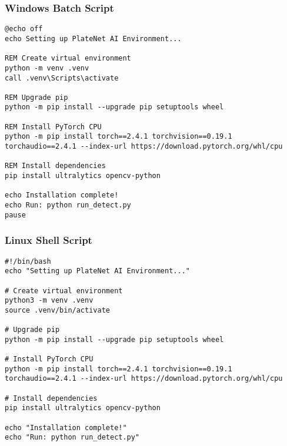 \documentclass[12pt,a4paper]{article}
\begin{document}
\subsubsection{Windows Batch Script}
\begin{lstlisting}[caption=Windows Installation Script]
@echo off
echo Setting up PlateNet AI Environment...

REM Create virtual environment
python -m venv .venv
call .venv\Scripts\activate

REM Upgrade pip
python -m pip install --upgrade pip setuptools wheel

REM Install PyTorch CPU
python -m pip install torch==2.4.1 torchvision==0.19.1 torchaudio==2.4.1 --index-url https://download.pytorch.org/whl/cpu

REM Install dependencies
pip install ultralytics opencv-python

echo Installation complete!
echo Run: python run_detect.py
pause
\end{lstlisting}

\subsubsection{Linux Shell Script}
\begin{lstlisting}[caption=Linux Installation Script]
#!/bin/bash
echo "Setting up PlateNet AI Environment..."

# Create virtual environment
python3 -m venv .venv
source .venv/bin/activate

# Upgrade pip
python -m pip install --upgrade pip setuptools wheel

# Install PyTorch CPU
python -m pip install torch==2.4.1 torchvision==0.19.1 torchaudio==2.4.1 --index-url https://download.pytorch.org/whl/cpu

# Install dependencies
pip install ultralytics opencv-python

echo "Installation complete!"
echo "Run: python run_detect.py"
\end{lstlisting}
\end{document}
